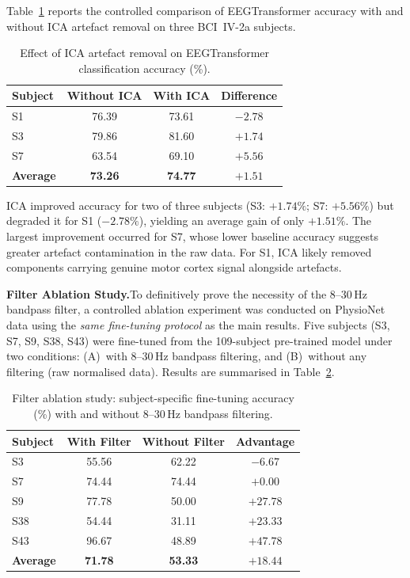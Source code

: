 \documentclass[12pt, a4paper]{article}
\begin{document}
Table~\ref{tab:ica_comparison} reports the controlled comparison of EEGTransformer accuracy with and without ICA artefact removal on three BCI~IV-2a subjects.

\begin{table}[htbp]
\centering
\caption{Effect of ICA artefact removal on EEGTransformer classification accuracy (\%).}
\label{tab:ica_comparison}
\begin{tabular}{lccc}
\toprule
\textbf{Subject} & \textbf{Without ICA} & \textbf{With ICA} & \textbf{Difference} \\
\midrule
S1 & 76.39 & 73.61 & $-2.78$ \\
S3 & 79.86 & 81.60 & $+1.74$ \\
S7 & 63.54 & 69.10 & $+5.56$ \\
\midrule
\textbf{Average} & \textbf{73.26} & \textbf{74.77} & $\mathbf{+1.51}$ \\
\bottomrule
\end{tabular}
\end{table}

ICA improved accuracy for two of three subjects (S3: $+1.74\%$; S7: $+5.56\%$) but degraded it for S1 ($-2.78\%$), yielding an average gain of only $+1.51\%$. The largest improvement occurred for S7, whose lower baseline accuracy suggests greater artefact contamination in the raw data. For S1, ICA likely removed components carrying genuine motor cortex signal alongside artefacts.

\textbf{Filter Ablation Study.}\quad To definitively prove the necessity of the 8--30\,Hz bandpass filter, a controlled ablation experiment was conducted on PhysioNet data using the \emph{same fine-tuning protocol} as the main results. Five subjects (S3, S7, S9, S38, S43) were fine-tuned from the 109-subject pre-trained model under two conditions: (A)~with 8--30\,Hz bandpass filtering, and (B)~without any filtering (raw normalised data). Results are summarised in Table~\ref{tab:filter_ablation}.

\begin{table}[h]
\centering
\caption{Filter ablation study: subject-specific fine-tuning accuracy (\%) with and without 8--30\,Hz bandpass filtering.}
\label{tab:filter_ablation}
\begin{tabular}{lccc}
\toprule
Subject & With Filter & Without Filter & Advantage \\
\midrule
S3  & 55.56 & 62.22 & $-6.67$ \\
S7  & 74.44 & 74.44 & $+0.00$ \\
S9  & 77.78 & 50.00 & $+27.78$ \\
S38 & 54.44 & 31.11 & $+23.33$ \\
S43 & 96.67 & 48.89 & $+47.78$ \\
\midrule
\textbf{Average} & \textbf{71.78} & \textbf{53.33} & $\mathbf{+18.44}$ \\
\bottomrule
\end{tabular}
\end{table}
\end{document}

